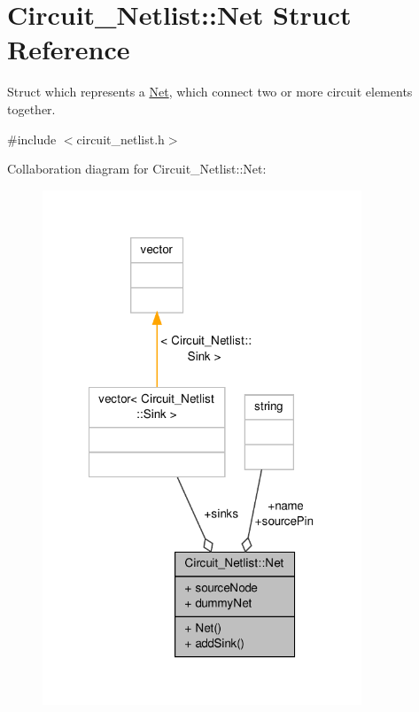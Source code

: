\hypertarget{structCircuit__Netlist_1_1Net}{\section{Circuit\-\_\-\-Netlist\-:\-:Net Struct Reference}
\label{structCircuit__Netlist_1_1Net}
}


Struct which represents a \hyperlink{structCircuit__Netlist_1_1Net}{Net}, which connect two or more circuit elements together.  




{\ttfamily \#include $<$circuit\-\_\-netlist.\-h$>$}



Collaboration diagram for Circuit\-\_\-\-Netlist\-:\-:Net\-:\nopagebreak
\begin{figure}[H]
\begin{center}
\leavevmode
\includegraphics[width=270pt]{structCircuit__Netlist_1_1Net__coll__graph}
\end{center}
\end{figure}
